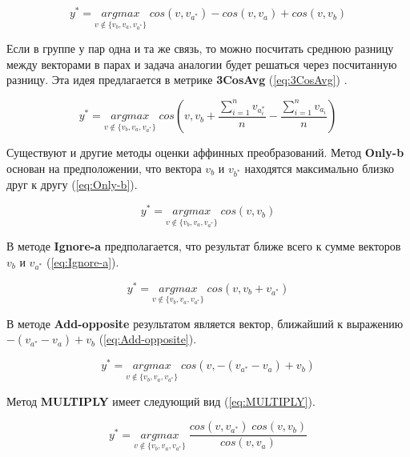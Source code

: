 \documentclass[a4paper,14pt]{article}
\begin{document}
\begin{equation}
	y^* = \underset{v \notin \{v_b, v_a, v_{a^*}\}}{argmax} \; cos(v, v_{a^*}) - cos(v, v_a) + cos(v, v_b)
	\label{eq:3CosMul}
\end{equation}

Если в группе у пар одна и та же связь, то можно посчитать среднюю разницу между векторами в парах и задача аналогии будет решаться через посчитанную разницу.
Эта идея предлагается в метрике	\textbf{3CosAvg} (\ref{eq:3CosAvg}) \cite{28}.

\begin{equation}
	y^* = \underset{v \notin \{v_b, v_a, v_{a^*}\}}{argmax} \; cos(v,v_b + \dfrac{\sum_{i=1}^{n}v_{a_i^*}}{n} - \dfrac{\sum_{i=1}^{n}v_{a_i}}{n})
	\label{eq:3CosAvg}
\end{equation}

Существуют и другие методы оценки аффинных преобразований.
Метод \textbf{Only-b} \cite{27} основан на предположении, что вектора $v_b$ и $v_{b^*}$ находятся максимально близко друг к другу (\ref{eq:Only-b}).

\begin{equation}
	y^* = \underset{v \notin \{v_b, v_a, v_{a^*}\}}{argmax} \; cos(v, v_b)
	\label{eq:Only-b}
\end{equation}

В методе \textbf{Ignore-a} \cite{27} предполагается, что результат ближе всего к сумме векторов $v_b$ и $v_{a^*}$ (\ref{eq:Ignore-a}).

\begin{equation}
	y^* = \underset{v \notin \{v_b, v_a, v_{a^*}\}}{argmax} \; cos(v, v_b + v_{a^*})
	\label{eq:Ignore-a}
\end{equation}

В методе \textbf{Add-opposite} \cite{27} результатом является вектор, ближайший к выражению $-(v_{a^*} - v_a) + v_b$ (\ref{eq:Add-opposite}).

\begin{equation}
	y^* = \underset{v \notin \{v_b, v_a, v_{a^*}\}}{argmax} \; cos(v, -(v_{a^*} - v_a) + v_b)
	\label{eq:Add-opposite}
\end{equation}

Метод \textbf{MULTIPLY} \cite{27} имеет следующий вид (\ref{eq:MULTIPLY}).

\begin{equation}
	y^* = \underset{v \notin \{v_b, v_a, v_{a^*}\}}{argmax} \; \dfrac{cos(v, v_{a^*}) \; cos(v, v_b)}{cos(v, v_a)}
	\label{eq:MULTIPLY}
\end{equation}
\end{document}
